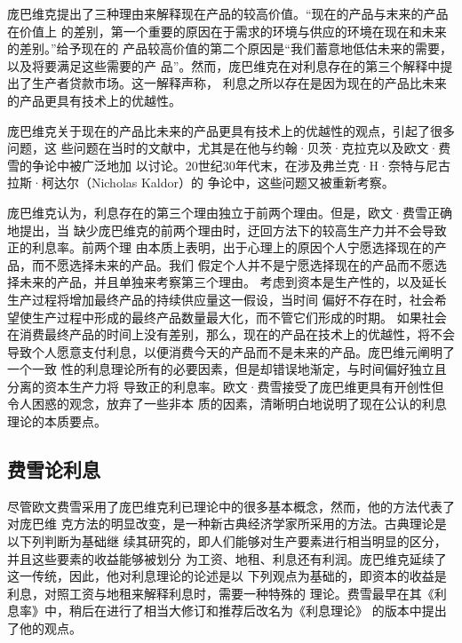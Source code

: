 庞巴维克提出了三种理由来解释现在产品的较高价值。“现在的产品与末来的产品在价值上
的差别，第一个重要的原因在于需求的环境与供应的环境在现在和未来的差别。”给予现在的
产品较高价值的第二个原因是“我们蓄意地低估未来的需要，以及将要满足这些需要的产
品”。然而，庞巴维克在对利息存在的第三个解释中提出了生产者贷款市场。这一解释声称，
利息之所以存在是因为现在的产品比未来的产品更具有技术上的优越性。

庞巴维克关于现在的产品比未来的产品更具有技术上的优越性的观点，引起了很多问题，这
些问题在当时的文献中，尤其是在他与约翰·贝茨·克拉克以及欧文·费雪的争论中被广泛地加
以讨论。20世纪30年代末，在涉及弗兰克·H·奈特与尼古拉斯·柯达尔（Nicholas Kaldor）的
争论中，这些问题又被重新考察。

庞巴维克认为，利息存在的第三个理由独立于前两个理由。但是，欧文·费雪正确地提出，当
缺少庞巴维克的前两个理由时，迂回方法下的较高生产力并不会导致正的利息率。前两个理
由本质上表明，出于心理上的原因个人宁愿选择现在的产品，而不愿选择未来的产品。我们
假定个人并不是宁愿选择现在的产品而不愿选择未来的产品，并且单独来考察第三个理由。
考虑到资本是生产性的，以及延长生产过程将增加最终产品的持续供应量这一假设，当时间
偏好不存在时，社会希望使生产过程中形成的最终产品数量最大化，而不管它们形成的时期。
如果社会在消费最终产品的时间上没有差别，那么，现在的产品在技术上的优越性，将不会
导致个人愿意支付利息，以便消费今天的产品而不是未来的产品。庞巴维元阐明了一个一致
性的利息理论所有的必要因素，但是却错误地渐定，与时间偏好独立且分离的资本生产力将
导致正的利息率。欧文·费雪接受了庞巴维更具有开创性但令人困惑的观念，放弃了一些非本
质的因素，清晰明白地说明了现在公认的利息理论的本质要点。

\subsection{费雪论利息}

尽管欧文费雪采用了庞巴维克利已理论中的很多基本概念，然而，他的方法代表了对庞巴维
克方法的明显改变，是一种新古典经济学家所采用的方法。古典理论是以下列判断为基础继
续其研究的，即人们能够对生产要素进行相当明显的区分，并且这些要素的收益能够被划分
为工资、地租、利息还有利润。庞巴维克延续了这一传统，因此，他对利息理论的论述是以
下列观点为基础的，即资本的收益是利息，对照工资与地租来解释利息时，需要一种特殊的
理论。费雪最早在其《利息率》中，稍后在进行了相当大修订和推荐后改名为《利息理论》
的版本中提出了他的观点。

